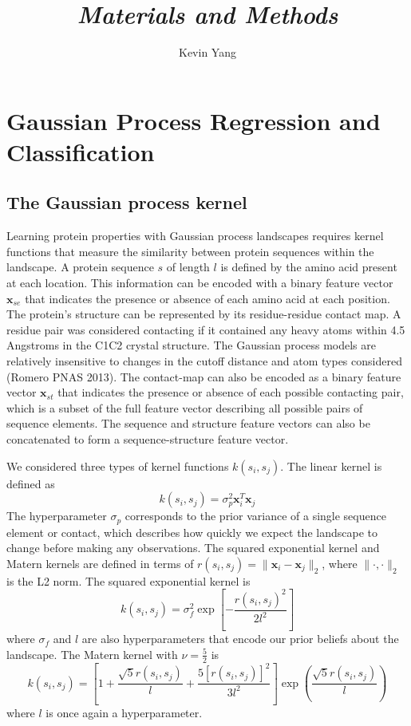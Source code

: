 \documentclass[12pt]{article}
\title{\textsl{Materials and Methods}}
\author{Kevin Yang}
\date{\vspace{-5ex}}
\begin{document}
	\section*{Gaussian Process Regression and Classification}
	\subsection*{The Gaussian process kernel}
	Learning protein properties with Gaussian process landscapes requires kernel functions that measure the similarity between protein sequences within the landscape. A protein sequence $s$ of length $l$ is defined by the amino acid present at each location. This information can be encoded with a binary feature vector $\mathbf{x}_{se}$ that indicates the presence or absence of each amino acid at each position. The protein's structure can be represented by its residue-residue contact map. A residue pair was considered contacting if it contained any heavy atoms within 4.5 Angstroms in the C1C2 crystal structure. The Gaussian process models are relatively insensitive to changes in the cutoff distance and atom types considered (Romero PNAS 2013). The contact-map can also be encoded as a binary feature vector $\mathbf{x}_{st}$ that indicates the presence or absence of each possible contacting pair, which is a subset of the full feature vector describing all possible pairs of sequence elements. The sequence and structure feature vectors can also be concatenated to form a sequence-structure feature vector. 
	
	We considered three types of kernel functions $k(s_i, s_j)$. The linear kernel is defined as 
	\begin{equation}
		k(s_i, s_j) = \sigma_p^2 \mathbf{x}_i^T\mathbf{x}_j
	\end{equation}
	The hyperparameter $\sigma_p$ corresponds to the prior variance of a single sequence element or contact, which describes how quickly we expect the landscape to change before making any observations. 
	The squared exponential kernel and Matern kernels are defined in terms of $r(s_i, s_j) = \|\mathbf{x}_i - \mathbf{x}_j\|_2$, where $\|\cdot,\cdot\|_2$ is the L2 norm. 
	The squared exponential kernel is
	\begin{equation}
		k(s_i, s_j) = \sigma_f^2\operatorname{exp}\left[-\frac{r(s_i, s_j)^2}{2l^2}\right]
	\end{equation}
	where $\sigma_f$ and $l$ are also hyperparameters that encode our prior beliefs about the landscape. 
	The Matern kernel with $\nu = \frac{5}{2}$ is 
	\begin{equation}
		k(s_i, s_j) = \left[1 + \frac{\sqrt{5}r(s_i, s_j)}{l} + \frac{5[r(s_i, s_j)]^2}{3l^2}\right] \operatorname{exp}\left(\frac{\sqrt{5}r(s_i, s_j)}{l}\right)
	\end{equation}
	where $l$ is once again a hyperparameter. 
\end{document}
